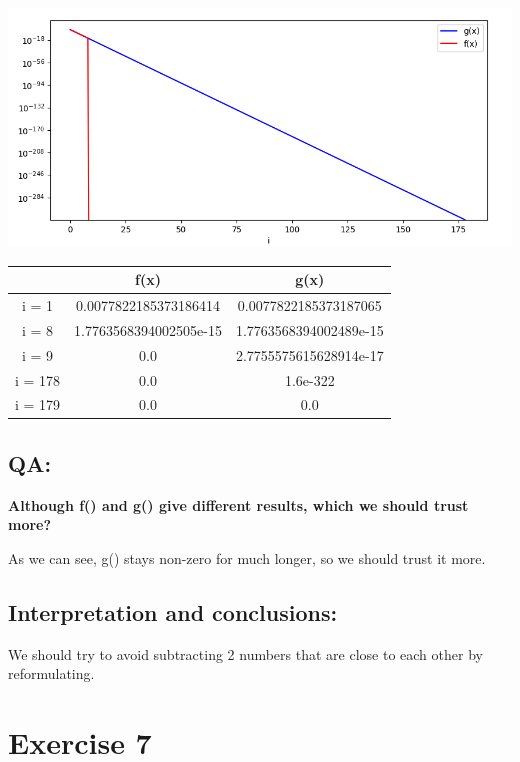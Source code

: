 \documentclass{article}
\begin{document}
\begin{center}
    \includegraphics[scale=0.6]{f_and_g_functions} 
\end{center}

\begin{center}
    \begin{tabular}{| c | c | c |}
        \hline
         & f(x) & g(x)\\ 
        \hline
        i = 1 & 0.0077822185373186414 & 0.0077822185373187065\\
        \hline
        i = 8 & 1.7763568394002505e-15 & 1.7763568394002489e-15\\
        \hline
        i = 9 & 0.0 & 2.7755575615628914e-17\\
        \hline
        i = 178 & 0.0 & 1.6e-322\\
        \hline
        i = 179 & 0.0 & 0.0\\
        \hline
    \end{tabular}
    \end{center}
    \subsection*{QA:}

    \begin{center}
        \textbf{Although f() and g() give different results, which we should trust more?}
    \end{center}
    As we can see, g() stays non-zero for much longer, so we should trust it more.

    \subsection*{Interpretation and conclusions:}
We should try to avoid subtracting 2 numbers that are close to each other by reformulating.

\section*{Exercise 7}
\end{document}
